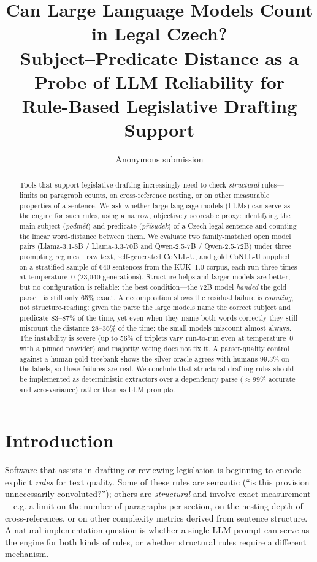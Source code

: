 \documentclass[11pt]{article}
\title{Can Large Language Models Count in Legal Czech? \\
Subject--Predicate Distance as a Probe of LLM Reliability for \\
Rule-Based Legislative Drafting Support}
\author{Anonymous submission}
\begin{document}
\maketitle

\begin{abstract}
Tools that support legislative drafting increasingly need to check \emph{structural} rules---limits
on paragraph counts, on cross-reference nesting, or on other measurable properties of a sentence.
We ask whether large language models (LLMs) can serve as the engine for such rules, using a narrow,
objectively scoreable proxy: identifying the main subject (\emph{podm\v{e}t}) and predicate
(\emph{p\v{r}\'{i}sudek}) of a Czech legal sentence and counting the linear word-distance between
them. We evaluate two family-matched open model pairs (Llama-3.1-8B / Llama-3.3-70B and
Qwen-2.5-7B / Qwen-2.5-72B) under three prompting regimes---raw text, self-generated CoNLL-U, and
gold CoNLL-U supplied---on a stratified sample of 640 sentences from the KUK~1.0 corpus, each run
three times at temperature~0 (23{,}040 generations). Structure helps and larger models are better,
but no configuration is reliable: the best condition---the 72B model \emph{handed} the gold
parse---is still only 65\% exact. A decomposition shows the residual failure is \emph{counting},
not structure-reading: given the parse the large models name the correct subject and predicate
83--87\% of the time, yet even when they name both words correctly they still miscount the distance
28--36\% of the time; the small models miscount almost always. The instability is
severe (up to 56\% of triplets vary run-to-run even at temperature~0 with a pinned provider) and
majority voting does not fix it. A parser-quality control against a human gold treebank shows the
silver oracle agrees with humans 99.3\% on the labels, so these failures are real. We conclude that
structural drafting rules should be implemented as deterministic extractors over a dependency parse
($\approx$99\% accurate and zero-variance) rather than as LLM prompts.
\end{abstract}

\section{Introduction}

Software that assists in drafting or reviewing legislation is beginning to encode explicit
\emph{rules} for text quality. Some of these rules are semantic (``is this provision unnecessarily
convoluted?''); others are \emph{structural} and involve exact measurement---e.g. a limit on the
number of paragraphs per section, on the nesting depth of cross-references, or on other
complexity metrics derived from sentence structure. A natural implementation question is whether a
single LLM prompt can serve as the engine for both kinds of rules, or whether structural rules
require a different mechanism.
\end{document}
